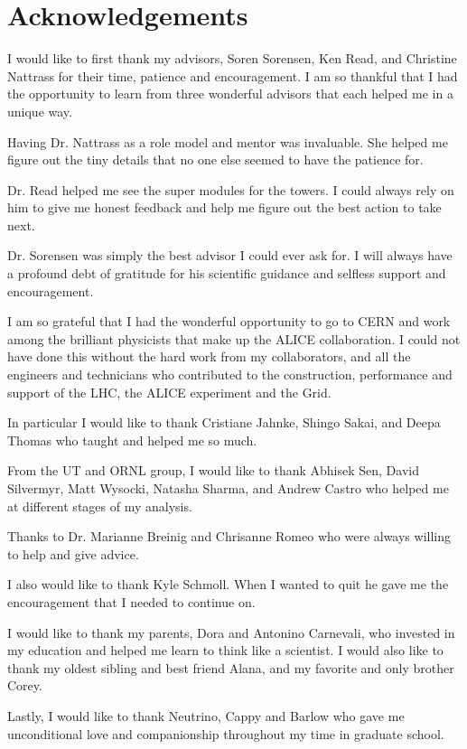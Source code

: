 \chapter*{Acknowledgements}

I would like to first thank my advisors, Soren Sorensen, Ken Read, and Christine Nattrass for their time, patience and encouragement. I am so thankful that I had the opportunity to learn from three wonderful advisors that each helped me in a unique way.

Having Dr. Nattrass as a role model and mentor was invaluable. She helped me figure out the tiny details that no one else seemed to have the patience for. 

Dr. Read helped me see the super modules for the towers. I could always rely on him to give me honest feedback and help me figure out the best action to take next.

Dr. Sorensen was simply the best advisor I could ever ask for. I will always have a profound debt of gratitude for his scientific guidance and selfless support and encouragement.

I am so grateful that I had the wonderful opportunity to go to CERN and work among the brilliant physicists that make up the ALICE collaboration. I could not have done this without the hard work from my collaborators, and all the engineers and technicians who contributed to the construction, performance and support of the LHC, the ALICE experiment and the Grid. 

In particular I would like to thank Cristiane Jahnke, Shingo Sakai, and Deepa Thomas who taught and helped me so much.

From the UT and ORNL group, I would like to thank Abhisek Sen, David Silvermyr, Matt Wysocki, Natasha Sharma, and Andrew Castro who helped me at different stages of my analysis.

Thanks to Dr. Marianne Breinig and Chrisanne Romeo who were always willing to help and give advice.

I also would like to thank Kyle Schmoll. When I wanted to quit he gave me the encouragement that I needed to continue on. 

I would like to thank my parents, Dora and Antonino Carnevali, who invested in my education and helped me learn to think like a scientist. I would also like to thank my oldest sibling and best friend Alana, and my favorite and only brother Corey.

Lastly, I would like to thank Neutrino, Cappy and Barlow who gave me unconditional love and companionship throughout my time in graduate school. 